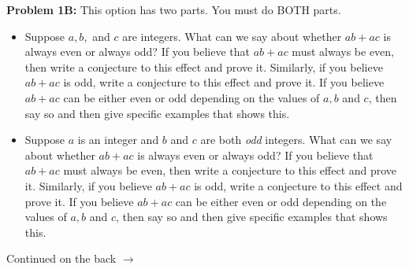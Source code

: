 \documentclass[11pt]{article}
\begin{document}
{{\textbf{Problem 1B:} This option has two parts. You must do BOTH parts. 
\begin{itemize}
	\item Suppose $a,b,$ and $c$ are integers. What can we say about whether $ab + ac$ is always even or always odd? If you believe that $ab + ac$ must always be even, then write a conjecture to this effect and prove it. Similarly, if you believe $ab + ac$ is odd, write a conjecture to this effect and prove it. If you believe $ab + ac$ can be either even or odd depending on the values of $a,b$ and $c$, then say so and then give specific examples that shows this.
	\item Suppose $a$ is an integer and $b$ and $c$ are both \emph{odd} integers.  What can we say about whether $ab + ac$ is always even or always odd? If you believe that $ab + ac$ must always be even, then write a conjecture to this effect and prove it. Similarly, if you believe $ab + ac$ is odd, write a conjecture to this effect and prove it. If you believe $ab + ac$ can be either even or odd depending on the values of $a,b$ and $c$, then say so and then give specific examples that shows this.
\end{itemize}
}}
	
	
\vfill
\begin{flushright}
	Continued on the back $\rightarrow$
\end{flushright}

	
\end{document}
